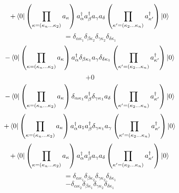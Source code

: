 \documentclass[12pt]{article}
\begin{document}
\begin{equation}
    +\bra{0}\left(\prod_{\kappa=\left(\kappa_{n}\dots\kappa_{2}\right)}a_{\kappa}\right)
        a^{\dag}_{\alpha }a^{\dag}_{\beta }a_{\gamma }a_{\delta }
    \left(\prod_{\kappa^{\prime}=\left(\kappa_{2}\dots\kappa_{n}\right)}a^{\dag}_{\kappa^{\prime}}\right)\ket{0}
\end{equation}
\begin{equation}
    =\delta _{\alpha  \kappa _{1}}\delta _{\beta  \kappa _{2}}\delta _{\gamma  \kappa _{2}}\delta _{\delta  \kappa _{1}}
\end{equation}
\begin{equation}
    -\bra{0}\left(\prod_{\kappa=\left(\kappa_{n}\dots\kappa_{2}\right)}a_{\kappa}\right)
        a^{\dag}_{\alpha }\delta _{\beta  \kappa _{1}}a_{\gamma }\delta _{\delta  \kappa _{1}}
    \left(\prod_{\kappa^{\prime}=\left(\kappa_{2}\dots\kappa_{n}\right)}a^{\dag}_{\kappa^{\prime}}\right)\ket{0}
\end{equation}          
\begin{equation}
    +0
\end{equation}
\begin{equation}
    -\bra{0}\left(\prod_{\kappa=\left(\kappa_{n}\dots\kappa_{2}\right)}a_{\kappa}\right)
        \delta _{\alpha  \kappa _{1}}a^{\dag}_{\beta }\delta _{\gamma  \kappa _{1}}a_{\delta }
    \left(\prod_{\kappa^{\prime}=\left(\kappa_{2}\dots\kappa_{n}\right)}a^{\dag}_{\kappa^{\prime}}\right)\ket{0}
\end{equation}
\begin{equation}
    +\bra{0}\left(\prod_{\kappa=\left(\kappa_{n}\dots\kappa_{2}\right)}a_{\kappa}\right)
        a^{\dag}_{\alpha }a_{1}a^{\dag}_{\beta }\delta _{\gamma  \kappa _{1}}a_{\gamma }
    \left(\prod_{\kappa^{\prime}=\left(\kappa_{2}\dots\kappa_{n}\right)}a^{\dag}_{\kappa^{\prime}}\right)\ket{0}
\end{equation}
\begin{equation}
    +\bra{0}\left(\prod_{\kappa=\left(\kappa_{n}\dots\kappa_{2}\right)}a_{\kappa}\right)
        a^{\dag}_{\alpha }a^{\dag}_{\beta }a_{\gamma }a_{\delta }
    \left(\prod_{\kappa^{\prime}=\left(\kappa_{2}\dots\kappa_{n}\right)}a^{\dag}_{\kappa^{\prime}}\right)\ket{0}
\end{equation}
\begin{equation}
    =\delta _{\alpha  \kappa _{1}}\delta _{\beta  \kappa _{2}}\delta _{\gamma  \kappa _{2}}\delta _{\delta  \kappa _{1}}
\end{equation}
\begin{equation}
    -\delta _{\alpha  \kappa _{2}}\delta _{\beta  \kappa _{1}}\delta _{\gamma  \kappa _{2}}\delta _{\delta  \kappa _{1}}
\end{equation}
\end{document}
